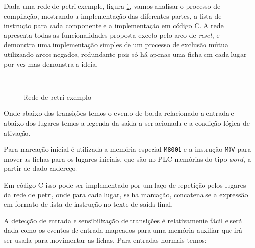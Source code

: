 

Dada uma rede de petri exemplo, figura \ref{fig:pnetcomp}, vamos analisar o processo de compilação, mostrando a implementação das diferentes partes, a lista de instrução para cada componente e a implementação em código C. A rede apresenta todas as funcionalidades proposta exceto pelo arco de \textit{reset}, e demonstra uma implementação simples de um processo de exclusão mútua utilizando arcos negados, redundante pois só há apenas uma ficha em cada lugar por vez mas demonstra a ideia. 

\begin{figure}[ht]
	\centering
	\caption{Rede de petri exemplo}
	\\
	\label{fig:pnetcomp}
\end{figure}

Onde abaixo das transições temos o evento de borda relacionado a entrada e abaixo dos lugares temos a legenda da saída a ser acionada e a condição lógica de ativação.

Para marcação inicial é utilizada a memória especial \lstinline{M8001} e a instrução \lstinline{MOV} para mover as fichas para os lugares iniciais, que são no PLC memórias do tipo \textit{word}, a partir de dado endereço.  



Em código C isso pode ser implementado por um laço de repetição pelos lugares da rede de petri, onde para cada lugar, se há marcação, concatena se a expressão em formato de lista de instrução no texto de saída final. 



A detecção de entrada e sensibilização de transições é relativamente fácil e será dada como os eventos de entrada mapeados para uma memória auxiliar que irá ser usada para movimentar as fichas. Para entradas normais temos:



